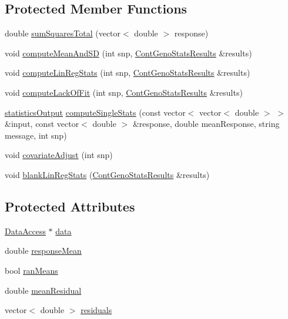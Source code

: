 \subsection*{Protected Member Functions}
\begin{DoxyCompactItemize}
\item 
double \hyperlink{classContGenoStats_aac4cebdec0c08a7a713ed31486e84404}{sumSquaresTotal} (vector$<$ double $>$ response)
\item 
void \hyperlink{classContGenoStats_a4e2fbf202fe9a14fa9130ac4486674f5}{computeMeanAndSD} (int snp, \hyperlink{structContGenoStatsResults}{ContGenoStatsResults} \&results)
\item 
void \hyperlink{classContGenoStats_abf83f07dacc05fa98f45c53bccc8489d}{computeLinRegStats} (int snp, \hyperlink{structContGenoStatsResults}{ContGenoStatsResults} \&results)
\item 
void \hyperlink{classContGenoStats_a19a72ee3254feaf596fde9b4f0446647}{computeLackOfFit} (int snp, \hyperlink{structContGenoStatsResults}{ContGenoStatsResults} \&results)
\item 
\hyperlink{structContGenoStats_1_1statisticsOutput}{statisticsOutput} \hyperlink{classContGenoStats_a5bf2b6b904d77644a1e76eadbac9865a}{computeSingleStats} (const vector$<$ vector$<$ double $>$ $>$ \&input, const vector$<$ double $>$ \&response, double meanResponse, string message, int snp)
\item 
void \hyperlink{classContGenoStats_a7a75df670c1ee712c09255c3f4954961}{covariateAdjust} (int snp)
\item 
void \hyperlink{classContGenoStats_abd30393de9c715bf4613f917130617ef}{blankLinRegStats} (\hyperlink{structContGenoStatsResults}{ContGenoStatsResults} \&results)
\end{DoxyCompactItemize}
\subsection*{Protected Attributes}
\begin{DoxyCompactItemize}
\item 
\hyperlink{classDataAccess}{DataAccess} $\ast$ \hyperlink{classContGenoStats_a3e0477a12dd35807fa4e1335d8119a5d}{data}
\item 
double \hyperlink{classContGenoStats_acc4ad5538332d2b491c5526145a49fbe}{responseMean}
\item 
bool \hyperlink{classContGenoStats_ad1e33f4b7b4137273099df0d7dcbdb4d}{ranMeans}
\item 
double \hyperlink{classContGenoStats_a7dca7abc1d8302920600dd40a892b249}{meanResidual}
\item 
vector$<$ double $>$ \hyperlink{classContGenoStats_ace549196ed683fba9cd205a240ec552b}{residuals}
\end{DoxyCompactItemize}


